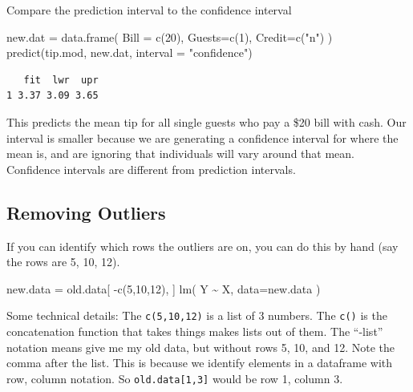 \documentclass[
  letterpaper,
  DIV=11,
  numbers=noendperiod]{scrreprt}
\newenvironment{Shaded}{\begin{snugshade}}{\end{snugshade}}
\newcommand{\AttributeTok}[1]{\textcolor[rgb]{0.49,0.56,0.16}{#1}}
\newcommand{\DecValTok}[1]{\textcolor[rgb]{0.25,0.63,0.44}{#1}}
\newcommand{\FunctionTok}[1]{\textcolor[rgb]{0.02,0.16,0.49}{#1}}
\newcommand{\NormalTok}[1]{\textcolor[rgb]{0.00,0.44,0.13}{#1}}
\newcommand{\OtherTok}[1]{\textcolor[rgb]{0.00,0.44,0.13}{#1}}
\newcommand{\SpecialCharTok}[1]{\textcolor[rgb]{0.25,0.44,0.63}{#1}}
\newcommand{\StringTok}[1]{\textcolor[rgb]{0.25,0.44,0.63}{#1}}
\begin{document}
Compare the prediction interval to the confidence interval

\begin{Shaded}
\begin{Highlighting}[]
\NormalTok{new.dat }\OtherTok{=} \FunctionTok{data.frame}\NormalTok{( }\AttributeTok{Bill =} \FunctionTok{c}\NormalTok{(}\DecValTok{20}\NormalTok{), }\AttributeTok{Guests=}\FunctionTok{c}\NormalTok{(}\DecValTok{1}\NormalTok{), }\AttributeTok{Credit=}\FunctionTok{c}\NormalTok{(}\StringTok{"n"}\NormalTok{) )}
\FunctionTok{predict}\NormalTok{(tip.mod, new.dat, }\AttributeTok{interval =} \StringTok{"confidence"}\NormalTok{)}
\end{Highlighting}
\end{Shaded}

\begin{verbatim}
   fit  lwr  upr
1 3.37 3.09 3.65
\end{verbatim}

This predicts the mean tip for all single guests who pay a \$20 bill
with cash. Our interval is smaller because we are generating a
confidence interval for where the mean is, and are ignoring that
individuals will vary around that mean. Confidence intervals are
different from prediction intervals.

\hypertarget{removing-outliers}{%
\subsection{Removing Outliers}\label{removing-outliers}}

If you can identify which rows the outliers are on, you can do this by
hand (say the rows are 5, 10, 12).

\begin{Shaded}
\begin{Highlighting}[]
\NormalTok{new.data }\OtherTok{=}\NormalTok{ old.data[ }\SpecialCharTok{{-}}\FunctionTok{c}\NormalTok{(}\DecValTok{5}\NormalTok{,}\DecValTok{10}\NormalTok{,}\DecValTok{12}\NormalTok{), ]}
\FunctionTok{lm}\NormalTok{( Y }\SpecialCharTok{\textasciitilde{}}\NormalTok{ X, }\AttributeTok{data=}\NormalTok{new.data )}
\end{Highlighting}
\end{Shaded}

Some technical details: The \texttt{c(5,10,12)} is a list of 3 numbers.
The \texttt{c()} is the concatenation function that takes things makes
lists out of them. The ``-list'' notation means give me my old data, but
without rows 5, 10, and 12. Note the comma after the list. This is
because we identify elements in a dataframe with row, column notation.
So \texttt{old.data{[}1,3{]}} would be row 1, column 3.
\end{document}

